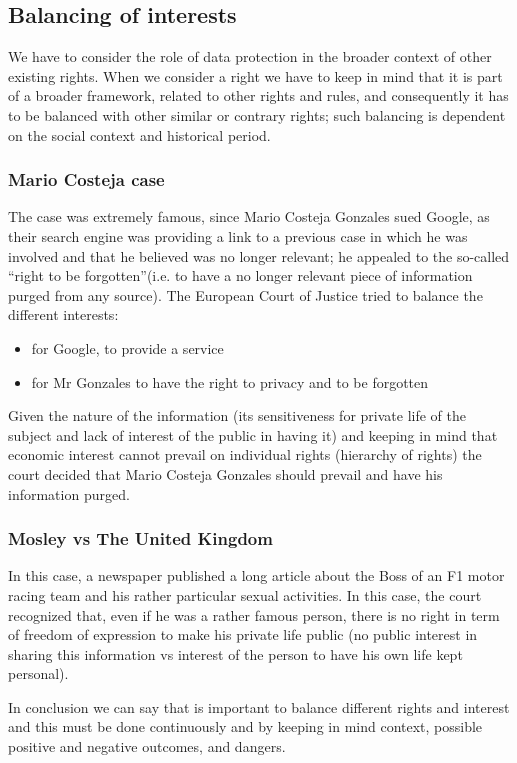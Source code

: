 \subsection{Balancing of interests}
We have to consider the role of data protection in the broader context of other existing rights. When we consider a right we have to keep in mind that it is part of a broader framework, related to other rights and rules, and consequently it has to be balanced with other similar or contrary rights; such balancing is dependent on the social context and historical period.
\subsubsection{Mario Costeja case}
The case was extremely famous, since Mario Costeja Gonzales sued Google, as their search engine was providing a link to a
previous case in which he was involved and that he believed was no longer relevant; he appealed to the so-called “right to be forgotten”(i.e. to have a no longer relevant piece of information purged from any source). The European Court of Justice tried to balance the different interests: 
\begin{itemize}
    \item for Google, to provide a service
    \item for Mr Gonzales to have the right to privacy and to be forgotten
\end{itemize}
Given the nature of the information (its sensitiveness for private life of the subject and lack of interest of the public in having it) and keeping in mind that economic interest cannot prevail on individual rights (hierarchy of rights) the court decided that Mario Costeja Gonzales should prevail and have his information purged.
\subsubsection{Mosley vs The United Kingdom}
In this case, a newspaper published a long article about the Boss of an F1 motor racing team and his rather particular sexual activities. In this case, the court recognized that, even if he was a rather famous person, there is no right in term of freedom of expression to make his private life public (no public interest in sharing this information vs interest of the person to have his own life kept personal).

In conclusion we can say that is important to balance different rights and interest and this must be done continuously and by keeping in mind context, possible positive and negative outcomes, and dangers.

